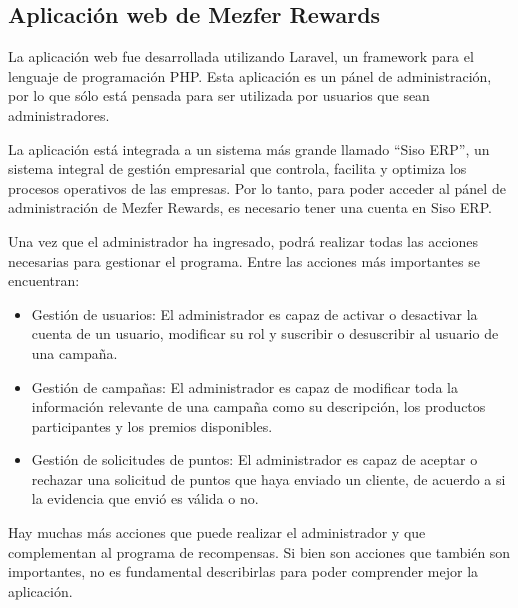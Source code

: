 \subsection{Aplicación web de Mezfer Rewards}
La aplicación web fue desarrollada utilizando Laravel, un framework para el lenguaje de programación PHP. Esta aplicación es un pánel de administración, por lo que sólo está pensada para ser utilizada por usuarios que sean administradores. 

La aplicación está integrada a un sistema más grande llamado ``Siso ERP'', un sistema integral de gestión empresarial que controla, facilita y optimiza los procesos operativos de las empresas. Por lo tanto, para poder acceder al pánel de administración de Mezfer Rewards, es necesario tener una cuenta en Siso ERP.

Una vez que el administrador ha ingresado, podrá realizar todas las acciones necesarias para gestionar el programa. Entre las acciones más importantes se encuentran: 
\begin{itemize}
    \item Gestión de usuarios: El administrador es capaz de activar o desactivar la cuenta de un usuario, modificar su rol y suscribir o desuscribir al usuario de una campaña.
    \item Gestión de campañas: El administrador es capaz de modificar toda la información relevante de una campaña como su descripción, los productos participantes y los premios disponibles.
    \item Gestión de solicitudes de puntos: El administrador es capaz de aceptar o rechazar una solicitud de puntos que haya enviado un cliente, de acuerdo a si la evidencia que envió es válida o no. 
\end{itemize}
Hay muchas más acciones que puede realizar el administrador y que complementan al programa de recompensas. Si bien son acciones que también son importantes, no es fundamental describirlas para poder comprender mejor la aplicación.